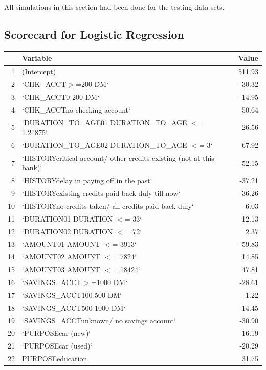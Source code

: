 \documentclass[10pt]{article}\usepackage[]{graphicx}\usepackage[]{color}
\begin{document}
All simulations in this section had been done for the testing data sets.

\clearpage


\subsection{Scorecard for Logistic Regression}

\begin{table}[ht]
\centering
\begin{tabular}{rlr}
\hline
& Variable & Value \\ 
\hline
1 & (Intercept) & 511.93 \\ 
2 & `CHK\_ACCT$>$=200 DM` & -30.32 \\ 
3 & `CHK\_ACCT0-200 DM` & -14.95 \\ 
4 & `CHK\_ACCTno checking account` & -50.64 \\ 
5 & `DURATION\_TO\_AGE01 DURATION\_TO\_AGE $<$= 1.21875` & 26.56 \\ 
6 & `DURATION\_TO\_AGE02 DURATION\_TO\_AGE $<$= 3` & 67.92 \\ 
7 & `HISTORYcritical account/ other credits existing (not at this bank)` & -52.15 \\ 
8 & `HISTORYdelay in paying off in the past` & -37.21 \\ 
9 & `HISTORYexisting credits paid back duly till now` & -36.26 \\ 
10 & `HISTORYno credits taken/ all credits paid back duly` & -6.03 \\ 
11 & `DURATION01 DURATION $<$= 33` & 12.13 \\ 
12 & `DURATION02 DURATION $<$= 72` & 2.37 \\ 
13 & `AMOUNT01 AMOUNT $<$= 3913` & -59.83 \\ 
14 & `AMOUNT02 AMOUNT $<$= 7824` & 14.85 \\ 
15 & `AMOUNT03 AMOUNT $<$= 18424` & 47.81 \\ 
16 & `SAVINGS\_ACCT$>$=1000 DM` & -28.61 \\ 
17 & `SAVINGS\_ACCT100-500 DM` & -1.22 \\ 
18 & `SAVINGS\_ACCT500-1000 DM` & -14.45 \\ 
19 & `SAVINGS\_ACCTunknown/ no savings account` & -30.90 \\ 
20 & `PURPOSEcar (new)` & 16.19 \\ 
21 & `PURPOSEcar (used)` & -20.29 \\ 
22 & PURPOSEeducation & 31.75 \\ 

\end{tabular}
\end{table}
\end{document}
